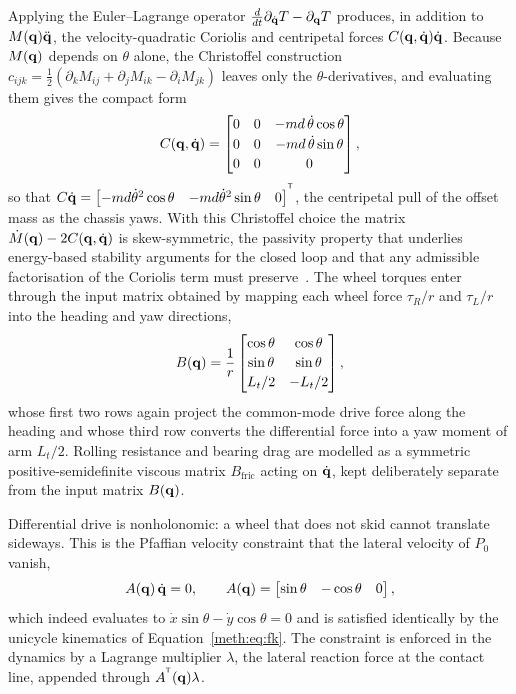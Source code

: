 Applying the Euler--Lagrange operator $\tfrac{d}{dt}\partial_{\dot{\mathbf{q}}}T-\partial_{\mathbf{q}}T$ produces, in addition to $M(\mathbf{q})\ddot{\mathbf{q}}$, the velocity-quadratic Coriolis and centripetal forces $C(\mathbf{q},\dot{\mathbf{q}})\dot{\mathbf{q}}$. Because $M(\mathbf{q})$ depends on $\theta$ alone, the Christoffel construction $c_{ijk}=\tfrac12(\partial_k M_{ij}+\partial_j M_{ik}-\partial_i M_{jk})$ leaves only the $\theta$-derivatives, and evaluating them gives the compact form
\begin{equation}\label{meth:eq:coriolis}
C(\mathbf{q},\dot{\mathbf{q}})=
\begin{bmatrix}
0 & 0 & -m d\,\dot\theta\cos\theta\\[2pt]
0 & 0 & -m d\,\dot\theta\sin\theta\\[2pt]
0 & 0 & 0
\end{bmatrix},
\end{equation}
so that $C\dot{\mathbf{q}}=\begin{bmatrix}-md\dot\theta^2\cos\theta & -md\dot\theta^2\sin\theta & 0\end{bmatrix}^{^{\mathsf{T}}}$, the centripetal pull of the offset mass as the chassis yaws. With this Christoffel choice the matrix $\dot M(\mathbf{q})-2C(\mathbf{q},\dot{\mathbf{q}})$ is skew-symmetric, the passivity property that underlies energy-based stability arguments for the closed loop and that any admissible factorisation of the Coriolis term must preserve~\cite{fierro1997wmr}. The wheel torques enter through the input matrix obtained by mapping each wheel force $\tau_R/r$ and $\tau_L/r$ into the heading and yaw directions,
\begin{equation}\label{meth:eq:inputmat}
B(\mathbf{q})=\frac{1}{r}
\begin{bmatrix}
\cos\theta & \cos\theta\\[2pt]
\sin\theta & \sin\theta\\[2pt]
L_t/2 & -L_t/2
\end{bmatrix},
\end{equation}
whose first two rows again project the common-mode drive force along the heading and whose third row converts the differential force into a yaw moment of arm $L_t/2$. Rolling resistance and bearing drag are modelled as a symmetric positive-semidefinite viscous matrix $B_{\mathrm{fric}}$ acting on $\dot{\mathbf{q}}$, kept deliberately separate from the input matrix $B(\mathbf{q})$.

Differential drive is nonholonomic: a wheel that does not skid cannot translate sideways. This is the Pfaffian velocity constraint that the lateral velocity of $P_0$ vanish,
\begin{equation}\label{meth:eq:pfaffian}
A(\mathbf{q})\,\dot{\mathbf{q}}=0,
\qquad
A(\mathbf{q})=\begin{bmatrix}\sin\theta & -\cos\theta & 0\end{bmatrix},
\end{equation}
which indeed evaluates to $\dot x\sin\theta-\dot y\cos\theta=0$ and is satisfied identically by the unicycle kinematics of Equation~\eqref{meth:eq:fk}. The constraint is enforced in the dynamics by a Lagrange multiplier $\lambda$, the lateral reaction force at the contact line, appended through $A^{^{\mathsf{T}}}(\mathbf{q})\lambda$.

